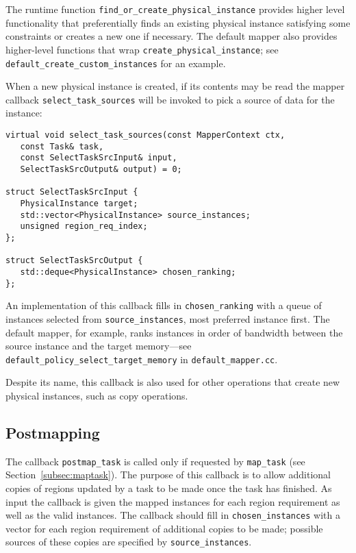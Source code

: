 The runtime function {\tt find\_or\_create\_physical\_instance} provides higher level functionality that preferentially finds an existing physical instance satisfying some constraints or creates a new one if necessary.  The default mapper also provides
higher-level functions that wrap {\tt create\_physical\_instance}; see {\tt default\_create\_custom\_instances} for an example.

When a new physical instance is created, if its contents may be read the mapper callback {\tt select\_task\_sources} will be invoked to pick a source of data for the instance:

\begin{lstlisting}
virtual void select_task_sources(const MapperContext ctx,
   const Task& task,
   const SelectTaskSrcInput& input,
   SelectTaskSrcOutput& output) = 0;

struct SelectTaskSrcInput {
   PhysicalInstance target;
   std::vector<PhysicalInstance> source_instances;
   unsigned region_req_index;
};

struct SelectTaskSrcOutput {
   std::deque<PhysicalInstance> chosen_ranking;
};
\end{lstlisting}
An implementation of this callback fills in {\tt chosen\_ranking} with a queue of instances selected from {\tt source\_instances}, most preferred instance first.  The default mapper, for example, ranks instances in order of bandwidth between the
source instance and the target memory---see {\tt default\_policy\_select\_target\_memory} in {\tt default\_mapper.cc}.

Despite its name, this callback is also used for other operations that create new physical instances, such as copy operations.

\subsection{Postmapping}
\label{subsec:postmap}

The callback {\tt postmap\_task} is called only if requested by {\tt map\_task} (see Section~\ref{subsec:maptask}).  The purpose
of this callback is to allow additional copies of regions updated by a task to be made once the task has finished.  As input
the callback is given the mapped instances for each region requirement as well as the valid instances.  The callback should fill
in {\tt chosen\_instances} with a vector for each region requirement of additional copies to be made; possible sources of these
copies are specified by {\tt source\_instances}.

